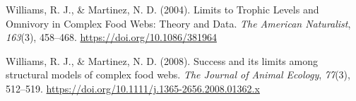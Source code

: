 \documentclass[
]{article}
\newlength{\cslhangindent}
\newenvironment{CSLReferences}[2] %
 {\begin{list}{}{%
  \setlength{\itemindent}{0pt}
  \setlength{\leftmargin}{0pt}
  \setlength{\parsep}{0pt}
  \ifodd #1
   \setlength{\leftmargin}{\cslhangindent}
   \setlength{\itemindent}{-1\cslhangindent}
  \fi
  \setlength{\itemsep}{#2\baselineskip}}}
 {\end{list}}
\begin{document}
\begin{CSLReferences}{1}{0}
Williams, R. J., \& Martinez, N. D. (2004). Limits to {Trophic Levels}
and {Omnivory} in {Complex Food Webs}: {Theory} and {Data}. \emph{The
American Naturalist}, \emph{163}(3), 458--468.
\url{https://doi.org/10.1086/381964}

Williams, R. J., \& Martinez, N. D. (2008). Success and its limits among
structural models of complex food webs. \emph{The Journal of Animal
Ecology}, \emph{77}(3), 512--519.
\url{https://doi.org/10.1111/j.1365-2656.2008.01362.x}

\end{CSLReferences}
\end{document}

